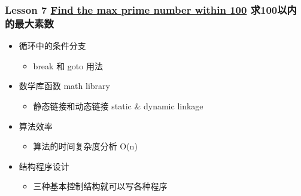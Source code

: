 \begin{frame}\frametitle{Lesson 7 \href{Lesson-7.md}{Find the max prime
number within 100} 求100以内的最大素数}

\begin{itemize}
\item
  循环中的条件分支
  \begin{itemize}
  \item
    break 和 goto 用法\\
  \end{itemize}
\item
  数学库函数 math library
  \begin{itemize}
  \item
    静态链接和动态链接 static \& dynamic linkage
  \end{itemize}
\item
  算法效率
  \begin{itemize}
  \item
    算法的时间复杂度分析 O(n)
  \end{itemize}
\item
  结构程序设计
  \begin{itemize}
  \item
    三种基本控制结构就可以写各种程序
  \end{itemize}
\end{itemize}
\end{frame}
